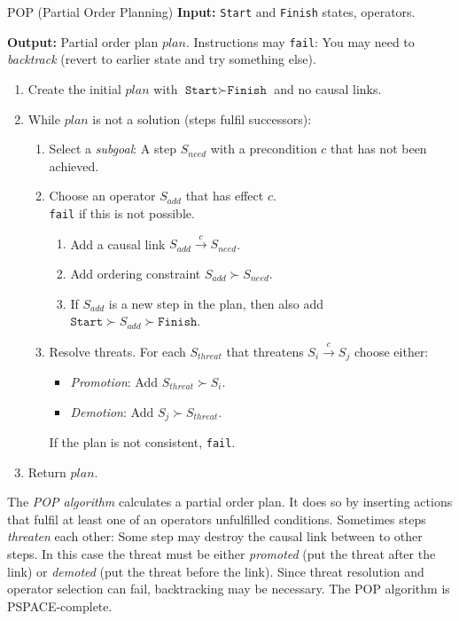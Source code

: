 \documentclass[english]{panikzettel}
\begin{document}
\begin{algo}{POP (Partial Order Planning)}
\textbf{Input:} \texttt{Start} and \texttt{Finish} states, operators.

\textbf{Output:} Partial order plan $plan$.
\tcblower
{\small Instructions may \texttt{fail}: You may need to \emph{backtrack} (revert to earlier state and try something else).}
\smallskip

\begin{enumerate}
    \item Create the initial $plan$ with $\texttt{Start} \succ \texttt{Finish}$ and no causal links.
    \item While $plan$ is not a solution (steps fulfil successors):
        \begin{enumerate}
            \item Select a \emph{subgoal}: A step $S_{need}$ with a precondition $c$ that has not been achieved.
            \item Choose an operator $S_{add}$ that has effect $c$. \\
                  \texttt{fail} if this is not possible.
                \begin{enumerate}
                    \item Add a causal link $S_{add} \stackrel{c}{\to} S_{need}$.
                    \item Add ordering constraint $S_{add} \succ S_{need}$.
                    \item If $S_{add}$ is a new step in the plan, then also add $\texttt{Start} \succ S_{add} \succ \texttt{Finish}$.
                \end{enumerate}
            \item Resolve threats. For each $S_{threat}$ that threatens $S_i \stackrel{c}{\to} S_j$ choose either:
                \begin{itemize}[leftmargin=2em]
                    \item \emph{Promotion}: Add $S_{threat} \succ S_i$.
                    \item \emph{Demotion}: Add $S_j \succ S_{threat}$.
                \end{itemize}
                If the plan is not consistent, \texttt{fail}.
        \end{enumerate}
    \item Return $plan$.
\end{enumerate}
\end{algo}

The \emph{POP algorithm} calculates a partial order plan.
It does so by inserting actions that fulfil at least one of an operators unfulfilled conditions.
Sometimes steps \emph{threaten} each other: Some step may destroy the causal link between to other steps.
In this case the threat must be either \emph{promoted} (put the threat after the link) or \emph{demoted} (put the threat before the link).
Since threat resolution and operator selection can fail, backtracking may be necessary.
The POP algorithm is PSPACE-complete.
\end{document}
